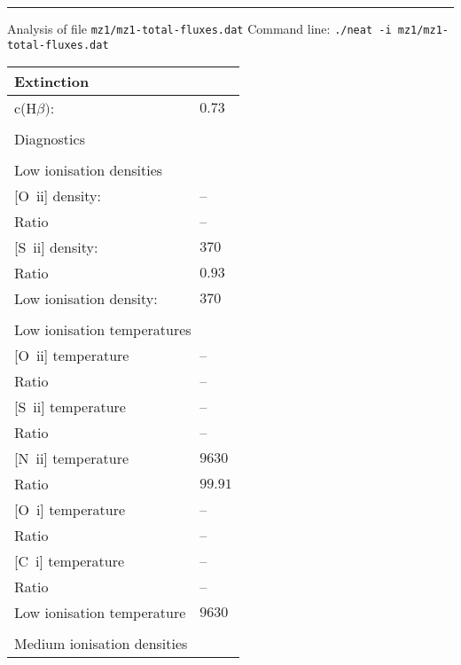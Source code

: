  \hrule
 \vspace{0.3cm}
 \noindent Analysis of file {\tt mz1/mz1-total-fluxes.dat}\newline
 \noindent Command line: {\tt ./neat -i mz1/mz1-total-fluxes.dat}\newline
 \begin{longtable}[l]{ll}
 \multicolumn{2}{l}{Extinction}\\ \hline
 c(H$\beta)$:                        & $  0.73$\\
 \vspace{0.2cm}\\\multicolumn{2}{l}{Diagnostics}\\ \hline
 \vspace{0.2cm}\\\multicolumn{2}{l}{Low ionisation densities}\\ \hline
 {}[O~{\sc ii}] density:             & -- \\
 Ratio                               & -- \\
 {}[S~{\sc ii}] density:             & $  370$\\
 Ratio                               & $  0.93$\\
 Low ionisation density:             & $  370$\\
 \vspace{0.2cm}\\\multicolumn{2}{l}{Low ionisation temperatures}\\ \hline
 {}[O~{\sc ii}] temperature          & -- \\
 Ratio                               & -- \\
 {}[S~{\sc ii}] temperature          & -- \\
 Ratio                               & -- \\
 {}[N~{\sc ii}] temperature          & $ 9630$\\
 Ratio                               & $ 99.91$\\
 {}[O~{\sc i}] temperature           & -- \\
 Ratio                               & -- \\
 {}[C~{\sc i}] temperature           & -- \\
 Ratio                               & -- \\
 Low ionisation temperature          & $ 9630$\\
 \vspace{0.2cm}\\\multicolumn{2}{l}{Medium ionisation densities}\\ \hline

\end{longtable}
